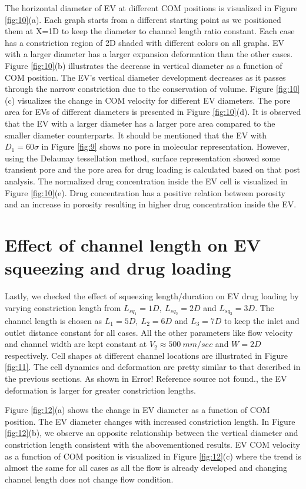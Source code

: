 The horizontal diameter of EV at different COM positions is visualized in Figure \ref{fig:10}(a). Each graph starts from a different starting point as we positioned them at X=1D to keep the diameter to channel length ratio constant. Each case has a constriction region of 2D shaded with different colors on all graphs. EV with a larger diameter has a larger expansion deformation than the other cases. Figure \ref{fig:10}(b) illustrates the decrease in vertical diameter as a function of COM position. The EV’s vertical diameter development decreases as it passes through the narrow constriction due to the conservation of volume. Figure \ref{fig:10}(c) visualizes the change in COM velocity for different EV diameters. 
The pore area for EVs of different diameters is presented in Figure \ref{fig:10}(d). It is observed that the EV with a larger diameter has a larger pore area compared to the smaller diameter counterparts. It should be mentioned that the EV with $D_1=60\sigma$ in Figure \ref{fig:9} shows no pore in molecular representation. However, using the Delaunay tessellation method, surface representation showed some transient pore and the pore area for drug loading is calculated based on that post analysis. The normalized drug concentration inside the EV cell is visualized in Figure \ref{fig:10}(e). Drug concentration has a positive relation between porosity and an increase in porosity resulting in higher drug concentration inside the EV.

\section{Effect of channel length on EV squeezing and drug loading}

Lastly, we checked the effect of squeezing length/duration on EV drug loading by varying constriction length from $L_{sq_1}=1D,\ L_{sq_2}=2D$ and $L_{sq_3}=3D$. The channel length is chosen as $ L_1=5D,\ L_2=6D$ and $L_3=7D$ to keep the inlet and outlet distance constant for all cases. All the other parameters like flow velocity and channel width are kept constant at $V_2\approx500\ mm/sec$ and $W=2D$ respectively. Cell shapes at different channel locations are illustrated in Figure \ref{fig:11}. The cell dynamics and deformation are pretty similar to that described in the previous sections. As shown in Error! Reference source not found., the EV deformation is larger for greater constriction lengths.

Figure \ref{fig:12}(a) shows the change in EV diameter as a function of COM position. The EV diameter changes with increased constriction length. In Figure \ref{fig:12}(b), we observe an opposite relationship between the vertical diameter and constriction length consistent with the abovementioned results. EV COM velocity as a function of COM position is visualized in Figure \ref{fig:12}(c) where the trend is almost the same for all cases as all the flow is already developed and changing channel length does not change flow condition. 
\\

